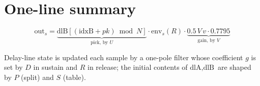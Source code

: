 \documentclass[11pt]{article}
\begin{document}
\section*{One-line summary}

\[
\text{out}_s
= \underbrace{\text{dlB}\!\left[(\text{idxB}+pk)\bmod N\right]}_{\text{pick, by } U}
\cdot \text{env}_s(R)
\cdot \underbrace{0.5\,V\,v\cdot 0.7795}_{\text{gain, by } V}
\]

Delay-line state is updated each sample by a one-pole filter whose coefficient $g$
is set by $D$ in sustain and $R$ in release; the initial contents of
$\text{dlA},\text{dlB}$ are shaped by $P$ (split) and $S$ (table).
\end{document}
